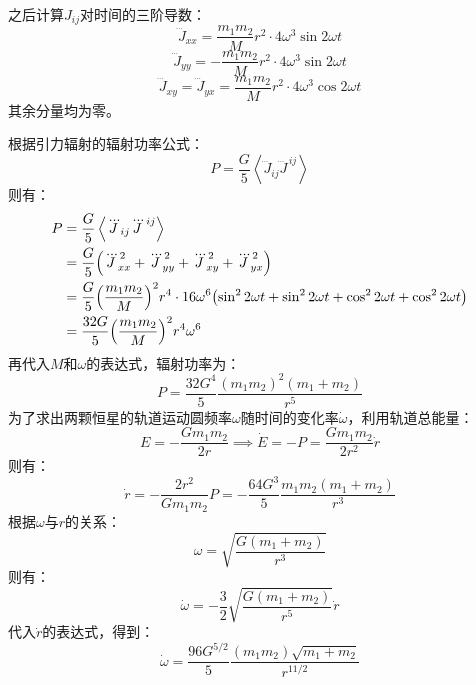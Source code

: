 \documentclass[a4paper]{article}
\begin{document}
\begin{enumerate}
    之后计算$J_{ij}$对时间的三阶导数：
    \[
        \dddot{J}_{xx} = \frac{m_1 m_2}{M} r^2 \cdot 4\omega^3 \sin{2\omega t}
    \]
    \[
        \dddot{J}_{yy} = -\frac{m_1 m_2}{M} r^2 \cdot 4\omega^3 \sin{2\omega t}
    \]
    \[
        \dddot{J}_{xy} = \dddot{J}_{yx} = \frac{m_1 m_2}{M} r^2 \cdot 4\omega^3 \cos{2\omega t}
    \]
    其余分量均为零。

    根据引力辐射的辐射功率公式：
    \[
        P = \frac{G}{5} \left\langle\dddot{J}_{ij} \dddot{J}^{\,ij}\right\rangle
    \]
    则有：
    \begin{align*}
        P
        &= \frac{G}{5} \left\langle\dddot{J}_{ij} \dddot{J}^{\,ij}\right\rangle \\
        &= \frac{G}{5} \qty(\dddot{J}_{xx}^{\,2} + \dddot{J}_{yy}^{\,2} + \dddot{J}_{xy}^{\,2} + \dddot{J}_{yx}^{\,2}) \\
        &= \frac{G}{5} \qty(\frac{m_1 m_2}{M})^2 r^4 \cdot 16\omega^6 \qty(\sin^2{2\omega t} + \sin^2{2\omega t} + \cos^2{2\omega t} + \cos^2{2\omega t}) \\
        &= \frac{32G}{5} \qty(\frac{m_1 m_2}{M})^2 r^4 \omega^6
    \end{align*}
    再代入$M$和$\omega$的表达式，辐射功率为：
    \[
        P = \frac{32G^4}{5} \frac{(m_1 m_2)^2 (m_1 + m_2)}{r^5}
    \]
    为了求出两颗恒星的轨道运动圆频率$\omega$随时间的变化率$\dot{\omega}$，利用轨道总能量：
    \[
        E = -\frac{Gm_1 m_2}{2r} \implies \dot{E} = -P = \frac{G m_1 m_2}{2r^2} \dot{r}
    \]
    则有：
    \[
        \dot{r} = -\frac{2r^2}{G m_1 m_2} P = -\frac{64G^3}{5} \frac{m_1 m_2 (m_1 + m_2)}{r^3}
    \]
    根据$\omega$与$r$的关系：
    \[
        \omega = \sqrt{\frac{G(m_1 + m_2)}{r^3}}
    \]
    则有：
    \[
        \dot{\omega} = -\frac{3}{2} \sqrt{\frac{G(m_1 + m_2)}{r^5}} \dot{r}
    \]
    代入$\dot{r}$的表达式，得到：
    \[
        \dot{\omega} = \frac{96G^{5/2}}{5} \frac{(m_1 m_2) \sqrt{m_1 + m_2}}{r^{11/2}}
    \]

\end{enumerate}
\end{document}
